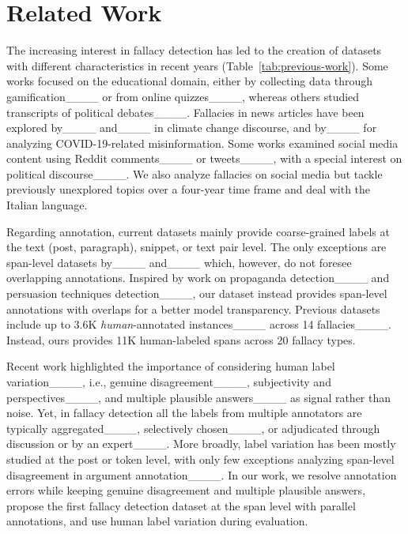 \section{Related Work}
\label{sec:related-work}

The increasing interest in fallacy detection has led to the creation of datasets with different characteristics in recent years (Table~\ref{tab:previous-work}). 
Some works focused on the educational domain, either by collecting data through gamification____ or from online quizzes____, whereas others studied transcripts of political debates____. Fallacies in news articles have been explored by____ and____ in climate change discourse, and by____ for analyzing COVID-19-related misinformation. 
Some works examined social media content using Reddit comments____ or tweets____, with a special interest on political discourse____.
We also analyze fallacies on social media but tackle previously unexplored topics over a four-year time frame and deal with the Italian language. 

Regarding annotation, current datasets mainly provide coarse-grained labels at the text (post, paragraph), snippet, or text pair level. The only exceptions are span-level datasets by____ and____ which, however, do not foresee overlapping annotations. Inspired by work on propaganda detection____ and persuasion techniques detection____, our dataset instead provides span-level annotations with overlaps for a better model transparency. Previous datasets include up to 3.6K \emph{human}-annotated instances____ across 14 fallacies____. Instead, ours provides 11K human-labeled spans across 20 fallacy types.

Recent work highlighted the importance of considering human label variation____, i.e., genuine disagreement____, subjectivity and perspectives____, and multiple plausible answers____ as signal rather than noise. Yet, in fallacy detection all the labels from multiple annotators are typically aggregated____, selectively chosen____, or adjudicated through discussion or by an expert____. 
More broadly, label variation has been mostly studied at the post or token level, with only few exceptions analyzing span-level disagreement in argument annotation____. 
In our work, we resolve annotation errors while keeping genuine disagreement and multiple plausible answers, propose the first fallacy detection dataset at the span level with parallel annotations, and use human label variation during evaluation.


